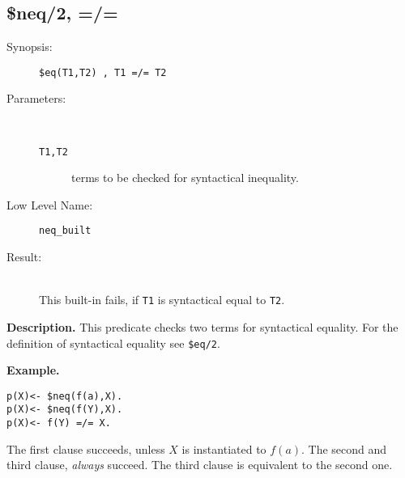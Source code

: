 %
%
%
\subsection{\$neq/2, =/=}

\begin{description}
\item[Synopsis:]
	{\tt \$eq(T1,T2) , T1 =/= T2 }
\item[Parameters:]\ \\[-0.5cm]
	\begin{description}
	\item[{\tt T1,T2}]
terms to be checked for syntactical inequality.
	\end{description}
\item[Low Level Name:]
	{\tt neq\_built}
\item[Result:]\ \\
This built-in fails, if {\tt T1} is syntactical equal to
{\tt T2}.
\end{description}

\vspace*{0.5cm}
\noindent
{\bf Description.}
This predicate checks two terms for syntactical equality.
For the definition of syntactical equality see {\tt \$eq/2}.

\vspace*{0.5cm}
\noindent
{\bf Example.}
\begin{verbatim}
p(X)<- $neq(f(a),X).
p(X)<- $neq(f(Y),X).
p(X)<- f(Y) =/= X.
\end{verbatim}
The first clause succeeds, unless $X$ is instantiated to $f(a)$.
The second and third clause, {\em always\/} succeed.
The third clause is equivalent to the second one.
 
